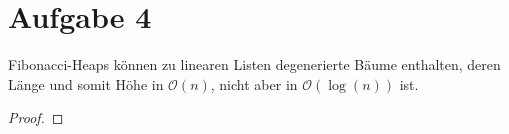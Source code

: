 \documentclass[10pt,a4paper]{article}
\begin{document}
\section{Aufgabe 4}

Fibonacci-Heaps können zu linearen Listen degenerierte Bäume enthalten, deren Länge und somit Höhe in $\mathscr{O}(n)$, nicht aber in $\mathscr{O}(\log(n))$ ist.

\begin{proof}

\end{proof}
\end{document}
